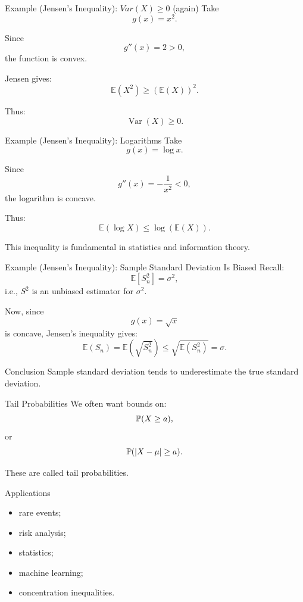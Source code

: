 \begin{frame}{Example (Jensen's Inequality): $Var(X)\geq 0 $ (again)}
Take
\[
g(x)=x^2.
\]

Since
\[
g''(x)=2>0,
\]
the function is convex.

\vspace{0.25cm}

Jensen gives:
\[
\mathbb{E}(X^2)
\ge
(\mathbb{E}(X))^2.
\]

Thus:
\[
\operatorname{Var}(X)\ge0.
\]
\end{frame}

\begin{frame}{Example (Jensen's Inequality): Logarithms}
Take
\[
g(x)=\log x.
\]

Since
\[
g''(x)=-\frac1{x^2}<0,
\]
the logarithm is concave.

\vspace{0.25cm}

Thus:
\[
{
\mathbb{E}(\log X)
\le
\log(\mathbb{E}(X)).
}
\]

\vspace{0.25cm}

This inequality is fundamental in statistics and information theory.
\end{frame}

\begin{frame}{Example (Jensen's Inequality): Sample Standard Deviation Is Biased}
Recall:
\[
\mathbb{E} [S_n^2] = \sigma^2, 
\]
i.e., $S^2$ is an unbiased estimator for $\sigma^2$.

Now, since
\[
g(x)=\sqrt{x}
\]
is concave,
Jensen's inequality gives:
\[
\mathbb{E}(S_n)
=
\mathbb{E}(\sqrt{S_n^2})
\le
\sqrt{\mathbb{E}(S_n^2)}
=
\sigma.
\]

\vspace{0.25cm}

\begin{keybox}{Conclusion}
Sample standard deviation tends to underestimate the true standard deviation.
\end{keybox}
\end{frame}


\begin{frame}{Tail Probabilities}
We often want bounds on:
\[
\mathbb{P}(X\ge a),
\]
or
\[
\mathbb{P}(|X-\mu|\ge a).
\]

\vspace{0.25cm}

These are called tail probabilities.

\vspace{0.25cm}

\begin{keybox}{Applications}
\begin{itemize}
    \item rare events;
    \item risk analysis;
    \item statistics;
    \item machine learning;
    \item concentration inequalities.
\end{itemize}
\end{keybox}
\end{frame}

